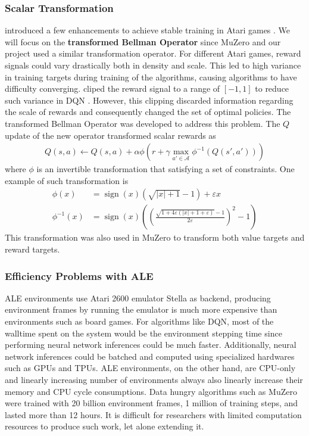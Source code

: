 \subsubsection{Scalar Transformation} \label{sec:scalar_transform}
\citeauthor{ObserveLookFurther_Pohlen.Piot.ea_2018} introduced a few enhancements to achieve stable training in Atari games \cite{ObserveLookFurther_Pohlen.Piot.ea_2018}.
We will focus on the \textbf{transformed Bellman Operator} since MuZero and our project used a similar transformation operator.
For different Atari games, reward signals could vary drastically both in density and scale.
This led to high variance in training targets during training of the algorithms, causing algorithms to have difficulty converging.
\citeauthor{PlayingAtariDeep_Mnih.Kavukcuoglu.ea_2013} cliped the reward signal to a range of $[-1, 1]$ to reduce such variance in DQN \cite{PlayingAtariDeep_Mnih.Kavukcuoglu.ea_2013}.
However, this clipping discarded information regarding the scale of rewards and consequently changed the set of optimal policies.
The transformed Bellman Operator was developed to address this problem.
The $Q$ update of the new operator transformed scalar rewards as
\begin{align*}
    Q(s, a) \leftarrow Q(s, a) + \alpha \phi \left(r +\gamma \max _{a' \in \mathcal{A}} \phi^{-1}\left(Q\left(s', a'\right)\right)\right)
\end{align*}
where $\phi$ is an invertible transformation that satisfying a set of constraints.
One example of such transformation is
\begin{align*}
    \phi(x)       & = \operatorname{sign}(x)\left(\sqrt{|x|+1}-1\right)+\varepsilon x  \\
    \phi^{-1}(x)  & = \operatorname{sign}(x)\left(\left(\frac{\sqrt{1+4 \varepsilon(|x|+1+\varepsilon)}-1}{2 \varepsilon}\right)^{2}-1\right)
\end{align*}
This transformation was also used in MuZero to transform both value targets and reward targets.

\subsubsection{Efficiency Problems with ALE}
ALE environments use Atari 2600 emulator Stella as backend, producing environment frames by running the emulator is much more expensive than environments such as board games.
For algorithms like DQN, most of the walltime spent on the system would be the environment stepping time since performing neural network inferences could be much faster.
Additionally, neural network inferences could be batched and computed using specialized hardwares such as GPUs and TPUs.
ALE environments, on the other hand, are CPU-only and linearly increasing number of environments always also linearly increase their memory and CPU cycle consumptions.
Data hungry algorithms such as MuZero were trained with 20 billion environment frames, 1 million of training steps, and lasted more than 12 hours.
It is difficult for researchers with limited computation resources to produce such work, let alone extending it.

